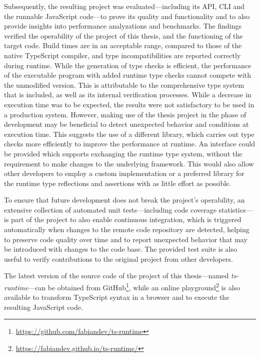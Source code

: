 Subsequently, the resulting project was evaluated---including its API, CLI and the runnable JavaScript code---to prove its quality and functionality and to also provide insights into performance analyzations and benchmarks. The findings verified the operability of the project of this thesis, and the functioning of the target code. Build times are in an acceptable range, compared to those of the native TypeScript compiler, and type incompatibilities are reported correctly during runtime. While the generation of type checks is efficient, the performance of the executable program with added runtime type checks cannot compete with the unmodified version. This is attributable to the comprehensive type system that is included, as well as its internal verification processes. While a decrease in execution time was to be expected, the results were not satisfactory to be used in a production system. However, making use of the thesis project in the phase of development may be beneficial to detect unexpected behavior and conditions at execution time. This suggests the use of a different library, which carries out type checks more efficiently to improve the performance at runtime. An interface could be provided which supports exchanging the runtime type system, without the requirement to make changes to the underlying framework. This would also allow other developers to employ a custom implementation or a preferred library for the runtime type reflections and assertions with as little effort as possible.

To ensure that future development does not break the project's operability, an extensive collection of automated unit tests---including code coverage statistics---is part of the project to also enable continuous integration, which is triggered automatically when changes to the remote code repository are detected, helping to preserve code quality over time and to report unexpected behavior that may be introduced with changes to the code base. The provided test suite is also useful to verify contributions to the original project from other developers.

The latest version of the source code of the project of this thesis---named \emph{ts-runtime}---can be obtained from GitHub\footnote{\url{https://github.com/fabiandev/ts-runtime}}, while an online playground\footnote{\url{https://fabiandev.github.io/ts-runtime/}} is also available to transform TypeScript syntax in a browser and to execute the resulting JavaScript code.
